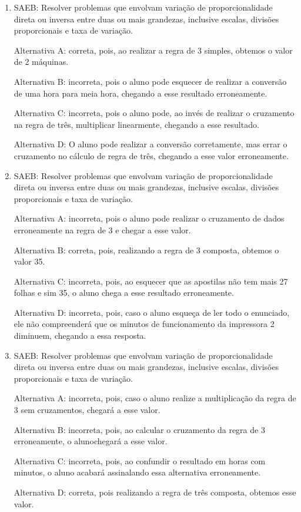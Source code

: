 	\begin{enumerate}

		\item SAEB: Resolver problemas que envolvam variação de proporcionalidade
direta ou inversa entre duas ou mais grandezas, inclusive escalas,
divisões proporcionais e taxa de variação.

Alternativa A: correta, pois, ao realizar a regra de 3 simples, obtemos
o valor de 2 máquinas.

Alternativa B: incorreta, pois o aluno pode esquecer de realizar a
conversão de uma hora para meia hora, chegando a esse resultado
erroneamente.

Alternativa C: incorreta, pois o aluno pode, ao invés de realizar o
cruzamento na regra de três, multiplicar linearmente, chegando a esse
resultado.

Alternativa D: O aluno pode realizar a conversão corretamente, mas errar
o cruzamento no cálculo de regra de três, chegando a esse valor
erroneamente.

		\item SAEB: Resolver problemas que envolvam variação de proporcionalidade
direta ou inversa entre duas ou mais grandezas, inclusive escalas,
divisões proporcionais e taxa de variação.

Alternativa A: incorreta, pois o aluno pode realizar o cruzamento de
dados erroneamente na regra de 3 e chegar a esse valor.

Alternativa B: correta, pois, realizando a regra de 3 composta, obtemos
o valor 35.

Alternativa C: incorreta, pois, ao esquecer que as apostilas não tem
mais 27 folhas e sim 35, o aluno chega a esse resultado erroneamente.

Alternativa D: incorreta, pois, caso o aluno esqueça de ler todo o
enunciado, ele não compreenderá que os minutos de funcionamento da
impressora 2 diminuem, chegando a essa resposta.

		\item SAEB: Resolver problemas que envolvam variação de proporcionalidade
direta ou inversa entre duas ou mais grandezas, inclusive escalas,
divisões proporcionais e taxa de variação.

Alternativa A: incorreta, pois, caso o aluno realize a multiplicação da
regra de 3 sem cruzamentos, chegará a esse valor.

Alternativa B: incorreta, pois, ao calcular o cruzamento da regra de 3
erroneamente, o alunochegará a esse valor.

Alternativa C: incorreta, pois, ao confundir o resultado em horas com
minutos, o aluno acabará assinalando essa alternativa erroneamente.

Alternativa D: correta, pois realizando a regra de três composta,
obtemos esse valor.

	\end{enumerate}


